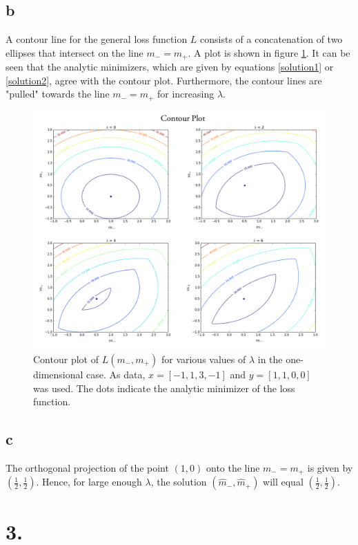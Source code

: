 \documentclass [a4paper] {report}
\begin{document}
	\subsection*{b}
	A contour line for the general loss function $L$ consists of a concatenation of two ellipses that intersect on the line $m_{-} = m_{+}$. A plot is shown in figure \ref{fig:contour}. It can be seen that the analytic minimizers, which are given by equations \ref{solution1} or \ref{solution2}, agree with the contour plot. Furthermore, the contour lines are "pulled" towards the line $m_{-} = m_{+}$ for increasing $\lambda$.
	\begin{figure}[H]
		\includegraphics[width = \textwidth]{Images/contour_plot.png}
		\caption{Contour plot of $L(m_{-}, m_{+})$ for various values of $\lambda$ in the one-dimensional case. As data, $x = [-1,1,3,-1]$ and $y=[1,1,0,0]$ was used. The dots indicate the analytic minimizer of the loss function.}
		\label{fig:contour}
	\end{figure}
	\subsection*{c}
	The orthogonal projection of the point $(1,0)$ onto the line $m_{-} = m_{+}$ is given by $\left(\frac{1}{2}, \frac{1}{2}\right)$. Hence, for large enough $\lambda$, the solution $(\hat{m}_{-},\hat{m}_{+})$ will equal $\left(\frac{1}{2}, \frac{1}{2}\right)$.
	\section*{3.}
\end{document}
